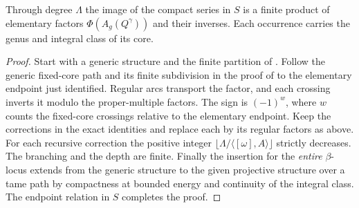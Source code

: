 \begin{proposition}\label{prop:finite}
Through degree $\Lambda$ the image of the compact series in $S$ is a
finite product of elementary factors $\Phi(A_g(Q^\gamma))$ and their
inverses. Each occurrence carries the genus and integral class of its core.
\end{proposition}
\begin{proof}
Start with a generic structure and the finite partition of
\cite[Proposition~3.18]{DIW}. Follow the generic fixed-core path and its
finite subdivision in the proof of \cite[Theorem~3.25]{DIW} to the
elementary endpoint just identified. Regular arcs transport the factor,
and each crossing inverts it modulo the proper-multiple factors.
The sign is $(-1)^w$, where $w$ counts the fixed-core crossings relative to the elementary endpoint. Keep the corrections in the exact identities and replace
each by its regular factors as above. For each recursive correction
the positive integer $\lfloor\Lambda/\langle[\omega],A\rangle\rfloor$
strictly decreases. The branching and the depth are finite. Finally
the insertion for the \emph{entire} $\beta$-locus extends from the
generic structure to the given projective structure over a tame path
by compactness at bounded energy and continuity of the integral class.
The endpoint relation in $S$ completes the proof.
\end{proof}

